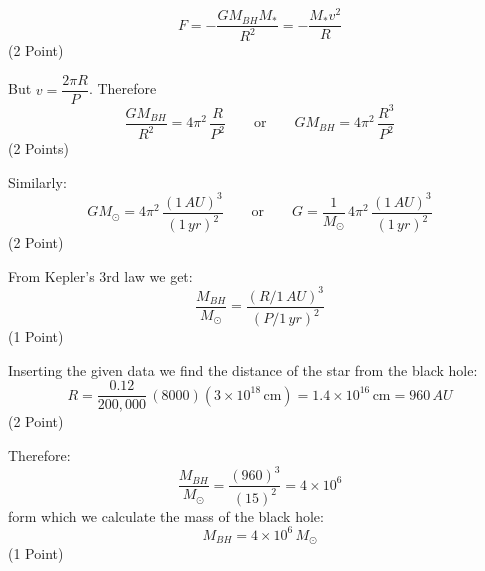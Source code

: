 \[
  F = -\frac{GM_{BH}M_*}{R^2} = -\frac{M_*v^2}{R}
\]
\hfill(2 Point)

But $v = \dfrac{2\pi R}{P}$. Therefore
\[
  \frac{GM_{BH}}{R^2} = 4\pi^2\,\frac{R}{P^2}
  \qquad\text{or}\qquad
  GM_{BH} = 4\pi^2\,\frac{R^3}{P^2}
\]
\hfill(2 Points)

Similarly:
\[
  GM_\odot = 4\pi^2\,\frac{(1\,AU)^3}{(1\,yr)^2}
  \qquad\text{or}\qquad
  G = \frac{1}{M_\odot}\,4\pi^2\,\frac{(1\,AU)^3}{(1\,yr)^2}
\]
\hfill(2 Point)

From Kepler's 3rd law we get:
\[
  \frac{M_{BH}}{M_\odot} = \frac{(R/1\,AU)^3}{(P/1\,yr)^2}
\]
\hfill(1 Point)

Inserting the given data we find the distance of the star from the black hole:
\[
  R = \frac{0.12}{200{,}000}\,(8000)(3\times10^{18}\,\mathrm{cm})
    = 1.4\times10^{16}\,\mathrm{cm} = 960\,AU
\]
\hfill(2 Point)

Therefore:
\[
  \frac{M_{BH}}{M_\odot} = \frac{(960)^3}{(15)^2} = 4\times10^{6}
\]
form which %
we calculate the mass of the black hole:
\[
  M_{BH} = 4\times10^{6}\,M_\odot
\]
\hfill(1 Point)

